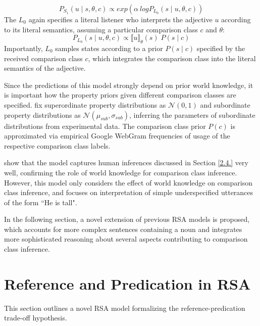 \begin{equation}
P_{S_1}( u \mid s, \theta, c) \propto exp(\alpha \: log P_{L_0} (s \mid u, \theta, c))
\end{equation}
The $L_0$ again specifies a literal listener who interprets the adjective $u$ according to its literal semantics, assuming a particular comparison class $c$ and $\theta$:
\begin{equation}
P_{L_0}(s \mid u, \theta, c) \propto \llbracket u \rrbracket_{\theta} (s) \; P( s \mid c)
\end{equation}  
Importantly, $L_0$ samples states according to a prior $P(s \mid c)$ specified by the received comparison class $c$, which integrates the comparison class into the literal semantics of the adjective. 

Since the predictions of this model strongly depend on prior world knowledge, it is important how the property priors given different comparison classes are specified. \textcite{tessler2017warm} fix superordinate property distributions as $\mathcal{N} (0, 1)$ and subordinate property distributions as $\mathcal{N}(\mu_{sub}, \sigma_{sub})$, inferring the parameters of subordinate distributions from experimental data. The comparison class prior $P(c)$ is approximated via empirical Google WebGram frequencies of usage of the respective comparison class labels. 

\textcite{tessler2017warm} show that the model captures human inferences discussed in Section \ref{2.4.} very well, confirming the role of world knowledge for comparison class inference. 
However, this model only considers the effect of world knowledge on comparison class inference, and focuses on interpretation of simple underspecified utterances of the form ``He is tall". 

In the following section, a novel extension of previous RSA models is proposed, which accounts for more complex sentences containing a noun and integrates more sophisticated reasoning about several aspects contributing to comparison class inference.  

\section{Reference and Predication in RSA}
This section outlines a novel RSA model formalizing the reference-predication trade-off hypothesis.

